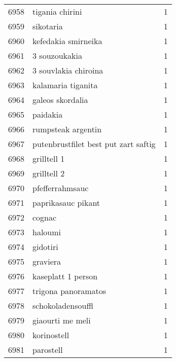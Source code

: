 \begin{tabular}{llr}
6958 &                                    tigania chirini &      1 \\
6959 &                                          sikotaria &      1 \\
6960 &                                kefedakia smirneika &      1 \\
6961 &                                      3 souzoukakia &      1 \\
6962 &                               3 souvlakia chiroina &      1 \\
6963 &                                 kalamaria tiganita &      1 \\
6964 &                                   galeos skordalia &      1 \\
6965 &                                           paidakia &      1 \\
6966 &                                 rumpsteak argentin &      1 \\
6967 &               putenbrustfilet best put zart saftig &      1 \\
6968 &                                        grilltell 1 &      1 \\
6969 &                                        grilltell 2 &      1 \\
6970 &                                    pfefferrahmsauc &      1 \\
6971 &                                 paprikasauc pikant &      1 \\
6972 &                                             cognac &      1 \\
6973 &                                            haloumi &      1 \\
6974 &                                           gidotiri &      1 \\
6975 &                                           graviera &      1 \\
6976 &                                 kaseplatt 1 person &      1 \\
6977 &                                trigona panoramatos &      1 \\
6978 &                                  schokoladensouffl &      1 \\
6979 &                                   giaourti me meli &      1 \\
6980 &                                        korinostell &      1 \\
6981 &                                          parostell &      1 \\

\end{tabular}
